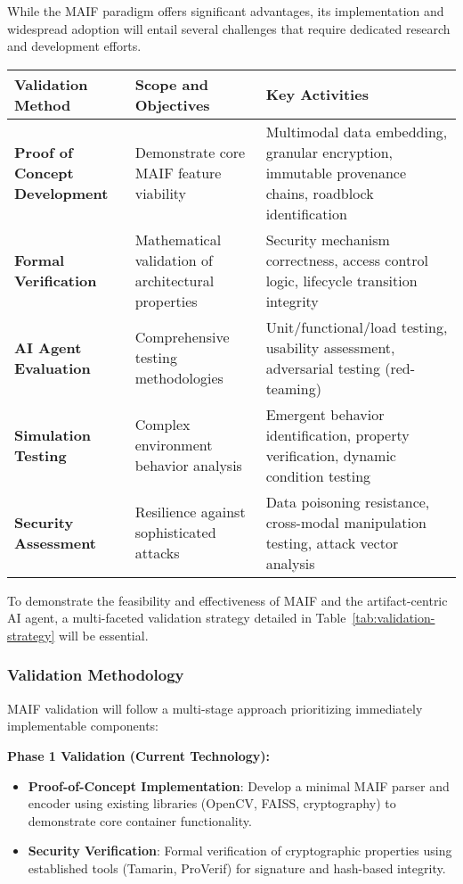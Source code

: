 \documentclass[conference]{IEEEtran}
\begin{document}
While the MAIF paradigm offers significant advantages, its implementation and widespread adoption will entail several challenges that require dedicated research and development efforts.

\begin{table*}[!t]
\renewcommand{\arraystretch}{1.3}
\caption{MAIF Validation Strategy and Implementation Approaches}
\label{tab:validation-strategy}
\centering
\footnotesize
\begin{tabular}{p{3.5cm}p{5.5cm}p{4.5cm}}
\toprule
\textbf{Validation Method} & \textbf{Scope and Objectives} & \textbf{Key Activities} \\
\midrule
\textbf{Proof of Concept Development} & Demonstrate core MAIF feature viability & Multimodal data embedding, granular encryption, immutable provenance chains, roadblock identification \\
\midrule
\textbf{Formal Verification} & Mathematical validation of architectural properties & Security mechanism correctness, access control logic, lifecycle transition integrity \\
\midrule
\textbf{AI Agent Evaluation} & Comprehensive testing methodologies & Unit/functional/load testing, usability assessment, adversarial testing (red-teaming) \\
\midrule
\textbf{Simulation Testing} & Complex environment behavior analysis & Emergent behavior identification, property verification, dynamic condition testing \\
\midrule
\textbf{Security Assessment} & Resilience against sophisticated attacks & Data poisoning resistance, cross-modal manipulation testing, attack vector analysis \\
\bottomrule
\end{tabular}
\end{table*}

To demonstrate the feasibility and effectiveness of MAIF and the artifact-centric AI agent, a multi-faceted validation strategy detailed in Table~\ref{tab:validation-strategy} will be essential.

\subsubsection{Validation Methodology}

MAIF validation will follow a multi-stage approach prioritizing immediately implementable components:

\textbf{Phase 1 Validation (Current Technology):}
\begin{itemize}[leftmargin=*]
\item \textbf{Proof-of-Concept Implementation}: Develop a minimal MAIF parser and encoder using existing libraries (OpenCV, FAISS, cryptography) to demonstrate core container functionality.
\item \textbf{Security Verification}: Formal verification of cryptographic properties using established tools (Tamarin, ProVerif) for signature and hash-based integrity.
\end{itemize}
\end{document}
